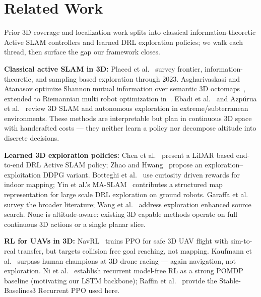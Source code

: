 \documentclass[conference]{IEEEtran}
\begin{document}
\section{Related Work}

Prior 3D coverage and localization work splits into classical information-theoretic Active SLAM controllers and learned DRL exploration policies; we walk each thread, then surface the gap our framework closes.

\textbf{Classical active SLAM in 3D:} Placed et al.~\cite{placed2023survey} survey frontier, information-theoretic, and sampling based exploration through 2023. Asgharivaskasi and Atanasov optimize Shannon mutual information over semantic 3D octomaps~\cite{asgharivaskasi2023semantic}, extended to Riemannian multi robot optimization in~\cite{asgharivaskasi2025riemannian}. Ebadi et al.~\cite{ebadi2023extreme} and Azp\'urua et al.~\cite{azpurua2023subterranean} review 3D SLAM and autonomous exploration in extreme/subterranean environments. These methods are interpretable but plan in continuous 3D space with handcrafted costs --- they neither learn a policy nor decompose altitude into discrete decisions.

\textbf{Learned 3D exploration policies:} Chen et al.~\cite{chen2024lidar} present a LiDAR based end-to-end DRL Active SLAM policy; Zhao and Hwang~\cite{zhao2024ddpg} propose an exploration--exploitation DDPG variant. Botteghi et al.~\cite{botteghi2021curiosity} use curiosity driven rewards for indoor mapping; Yin et al.'s MA-SLAM~\cite{yin2025maslam} contributes a structured map representation for large scale DRL exploration on ground robots. Garaffa et al.~\cite{garaffa2023survey} survey the broader literature; Wang et al.~\cite{wang2024exploration} address exploration enhanced source search. None is altitude-aware: existing 3D capable methods operate on full continuous 3D actions or a single planar slice.

\textbf{RL for UAVs in 3D:} NavRL~\cite{xu2025navrl} trains PPO for safe 3D UAV flight with sim-to-real transfer, but targets collision free goal reaching, not mapping. Kaufmann et al.~\cite{kaufmann2023racing} surpass human champions at 3D drone racing --- again navigation, not exploration. Ni et al.~\cite{ni2022recurrent} establish recurrent model-free RL as a strong POMDP baseline (motivating our LSTM backbone); Raffin et al.~\cite{raffin2021sb3} provide the Stable-Baselines3 Recurrent PPO used here.
\end{document}
